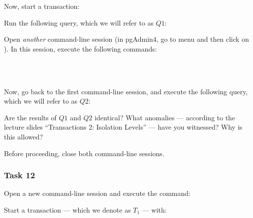 \vgap

\noindent Now, start a transaction:

\vgap

\noindent {}

\vgap

\noindent Run the following query, which we will refer to as $Q1$:

\vgap

\noindent {}

\vgap

\noindent Open {\em another} command-line session (in pgAdmin4, go to menu  and then click on ). In this session, execute the following commands:

\vgap

\noindent {}  \\
\noindent {}  \\
\noindent {}

\vgap

\noindent Now, go back to the first command-line session, and execute the following query, which we will refer to as $Q2$:

\vgap

\noindent {}

\vgap

\noindent Are the results of $Q1$ and $Q2$ identical? What anomalies --- according to the lecture slides ``Transactions 2:
Isolation Levels'' --- have you witnessed? Why is this allowed?

\vgap

\noindent Before proceeding, close both command-line sessions.

\subsubsection{Task 12}

Open a new command-line session and execute the command:

\vgap

\noindent {}

\vgap

\noindent Start a transaction --- which we denote as $T_1$ --- with:

\vgap

\noindent {}

